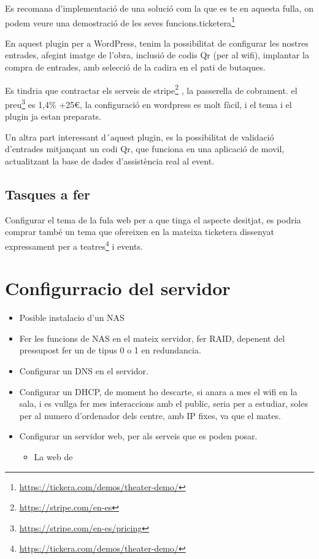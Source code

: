 \documentclass[
  10pt, krantz2,
]{krantz}
\DeclareRobustCommand{\href}[2]{#2\footnote{\url{#1}}}
\providecommand{\tightlist}{%
  \setlength{\itemsep}{0pt}\setlength{\parskip}{0pt}}
\renewcommand{\href}[2]{#2\footnote{\url{#1}}}
\begin{document}
Es recomana d'implementació de una solució com la que es te en aquesta fulla, on podem veure una demostració de les seves funcions.\href{https://tickera.com/demos/theater-demo/}{ticketera}

En aquest plugin per a WordPress, tenim la possibilitat de configurar les nostres entrades, afegint imatge de l'obra, inclusió de codis Qr (per al wifi), implantar la compra de entrades, amb selecció de la cadira en el pati de butaques.

Es tindria que contractar els serveis de \href{https://stripe.com/en-es}{stripe} , la passerella de cobrament. el \href{https://stripe.com/en-es/pricing}{preu} es 1,4\% +25€, la configuració en wordpress es molt fàcil, i el tema i el plugin ja estan preparats.

Un altra part interessant d´aquest plugin, es la possibilitat de validació d'entrades mitjançant un codi Qr, que funciona en una aplicació de movil, actualitzant la base de dades d'assistència real al event.

\hypertarget{tasques-a-fer}{%
\section{Tasques a fer}\label{tasques-a-fer}}

Configurar el tema de la fula web per a que tinga el aspecte desitjat, es podria comprar també un tema que ofereixen en la mateixa ticketera dissenyat expressament per a \href{https://tickera.com/demos/theater-demo/}{teatres} i events.

\hypertarget{configurracio-del-servidor}{%
\chapter{Configurracio del servidor}\label{configurracio-del-servidor}}

\begin{itemize}
\item
  Posible instalacio d'un NAS
\item
  Fer les funcions de NAS en el mateix servidor, fer RAID, depenent del pressupost fer un de tipus 0 o 1 en redundancia.
\item
  Configurar un DNS en el servidor.
\item
  Configurar un DHCP, de moment ho descarte, si anara a mes el wifi en la sala, i es vullga fer mes interaccions amb el public, seria per a estudiar, soles per al numero d'ordenador dels centre, amb IP fixes, va que el mates.
\item
  Configurar un servidor web, per als serveis que es poden posar.

  \begin{itemize}
  \tightlist
  \item
    La web de
  \end{itemize}
\end{itemize}
\end{document}
